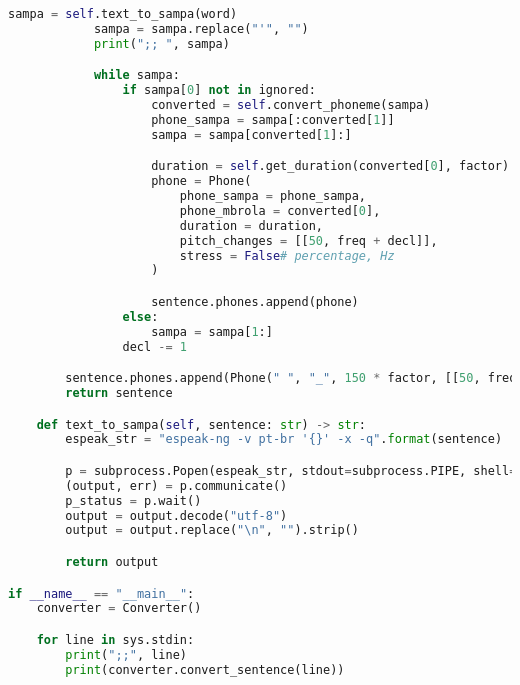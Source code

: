 \begin{lstlisting}[caption=Conversor eSpeakNG-MBROLA, label=conversao, language=Python]
            sampa = self.text_to_sampa(word)
            sampa = sampa.replace("'", "")
            print(";; ", sampa)

            while sampa:
                if sampa[0] not in ignored:
                    converted = self.convert_phoneme(sampa)
                    phone_sampa = sampa[:converted[1]]
                    sampa = sampa[converted[1]:]

                    duration = self.get_duration(converted[0], factor)
                    phone = Phone(
                        phone_sampa = phone_sampa,
                        phone_mbrola = converted[0],
                        duration = duration,
                        pitch_changes = [[50, freq + decl]],
                        stress = False# percentage, Hz
                    )

                    sentence.phones.append(phone)
                else:
                    sampa = sampa[1:]
                decl -= 1

        sentence.phones.append(Phone(" ", "_", 150 * factor, [[50, freq]]))
        return sentence

    def text_to_sampa(self, sentence: str) -> str:
        espeak_str = "espeak-ng -v pt-br '{}' -x -q".format(sentence)

        p = subprocess.Popen(espeak_str, stdout=subprocess.PIPE, shell=True)
        (output, err) = p.communicate()
        p_status = p.wait()
        output = output.decode("utf-8")
        output = output.replace("\n", "").strip()

        return output

if __name__ == "__main__":
    converter = Converter()

    for line in sys.stdin:
        print(";;", line)
        print(converter.convert_sentence(line))
\end{lstlisting}

